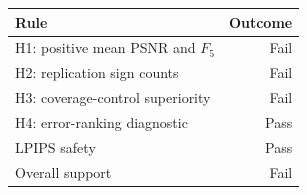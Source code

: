 \begin{tabular}{lr}
\toprule
Rule & Outcome \\
\midrule
H1: positive mean PSNR and $F_5$ & Fail \\
H2: replication sign counts & Fail \\
H3: coverage-control superiority & Fail \\
H4: error-ranking diagnostic & Pass \\
LPIPS safety & Pass \\
Overall support & Fail \\
\bottomrule
\end{tabular}
